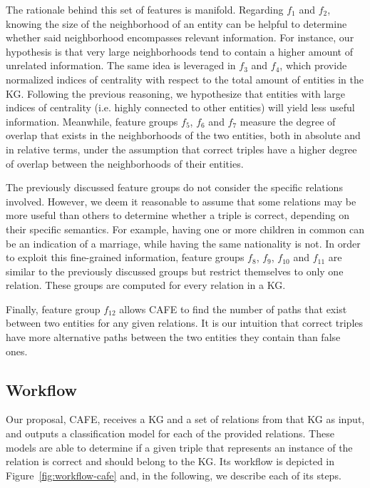 The rationale behind this set of features is manifold. Regarding $f_1$ and $f_2$, knowing the size of the neighborhood of an entity can be helpful to determine whether said neighborhood encompasses relevant information. For instance, our hypothesis is that very large neighborhoods tend to contain a higher amount of unrelated information. The same idea is leveraged in $f_3$ and $f_4$, which provide normalized indices of centrality with respect to the total amount of entities in the KG. Following the previous reasoning, we hypothesize that entities with large indices of centrality (i.e. highly connected to other entities) will yield less useful information. Meanwhile, feature groups $f_5$, $f_6$ and $f_7$ measure the degree of overlap that exists in the neighborhoods of the two entities, both in absolute and in relative terms, under the assumption that correct triples have a higher degree of overlap between the neighborhoods of their entities.

The previously discussed feature groups do not consider the specific relations involved. However, we deem it reasonable to assume that some relations may be more useful than others to determine whether a triple is correct, depending on their specific semantics. For example, having one or more children in common can be an indication of a marriage, while having the same nationality is not. In order to exploit this fine-grained information, feature groups $f_8$, $f_9$, $f_{10}$ and $f_{11}$ are similar to the previously discussed groups but restrict themselves to only one relation. These groups are computed for every relation in a KG.

Finally, feature group $f_{12}$ allows CAFE to find the number of paths that exist between two entities for any given relations. It is our intuition that correct triples have more alternative paths between the two entities they contain than false ones.

\subsection{Workflow}
Our proposal, CAFE, receives a KG and a set of relations from that KG as input, and outputs a classification model for each of the provided relations. These models are able to determine if a given triple that represents an instance of the relation is correct and should belong to the KG. Its workflow is depicted in Figure~\ref{fig:workflow-cafe} and, in the following, we describe each of its steps.

